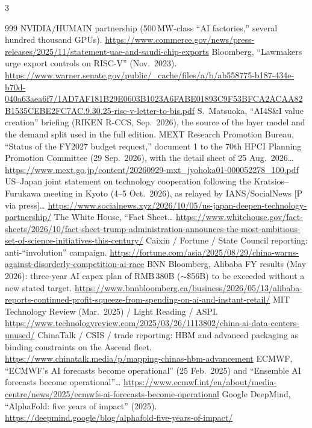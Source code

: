 \begin{multicols}{3}
\begin{thebibliography}{999}
 NVIDIA/HUMAIN partnership (500\,MW-class ``AI factories,'' several hundred thousand GPUs). \url{https://www.commerce.gov/news/press-releases/2025/11/statement-uae-and-saudi-chip-exports}
 Bloomberg, ``Lawmakers urge export controls on RISC-V'' (Nov.\ 2023). \url{https://www.warner.senate.gov/public/_cache/files/a/b/ab558775-b187-434e-b70d-040a63aea6f7/1AD7AF181B29E0603B1023A6FABE01893C9F53BFCA2ACAA82B1535CEBE2FC7AC.9.30.25-risc-v-letter-to-bis.pdf}
 S.~Matsuoka, ``AI4S\&I value creation'' briefing (RIKEN R-CCS, Sep.\ 2026), the source of the layer model and the demand split used in the full edition.
 MEXT Research Promotion Bureau, ``Status of the FY2027 budget request,'' document 1 to the 70th HPCI Planning Promotion Committee (29 Sep.\ 2026), with the detail sheet of 25 Aug.\ 2026… \url{https://www.mext.go.jp/content/20260929-mxt_jyohoka01-000052278_100.pdf}
 US--Japan joint statement on technology cooperation following the Kratsios--Furukawa meeting in Kyoto (4--5 Oct.\ 2026), as relayed by IANS/SocialNews [P via press]… \url{https://www.socialnews.xyz/2026/10/05/us-japan-deepen-technology-partnership/}
 The White House, ``Fact Sheet… \url{https://www.whitehouse.gov/fact-sheets/2026/10/fact-sheet-trump-administration-announces-the-most-ambitious-set-of-science-initiatives-this-century/}
 Caixin / Fortune / State Council reporting: anti-``involution'' campaign. \url{https://fortune.com/asia/2025/08/29/china-warns-against-disorderly-competition-ai-race}
 BNN Bloomberg, Alibaba FY results (May 2026): three-year AI capex plan of RMB\,380B ($\sim$\$56B) to be exceeded without a new stated target. \url{https://www.bnnbloomberg.ca/business/2026/05/13/alibaba-reports-continued-profit-squeeze-from-spending-on-ai-and-instant-retail/}
 MIT Technology Review (Mar.\ 2025) / Light Reading / ASPI. \url{https://www.technologyreview.com/2025/03/26/1113802/china-ai-data-centers-unused/}
 ChinaTalk / CSIS / trade reporting: HBM and advanced packaging as binding constraints on the Ascend fleet. \url{https://www.chinatalk.media/p/mapping-chinas-hbm-advancement}
 ECMWF, ``ECMWF's AI forecasts become operational'' (25 Feb.\ 2025) and ``Ensemble AI forecasts become operational''… \url{https://www.ecmwf.int/en/about/media-centre/news/2025/ecmwfs-ai-forecasts-become-operational}
 Google DeepMind, ``AlphaFold: five years of impact'' (2025). \url{https://deepmind.google/blog/alphafold-five-years-of-impact/}

\end{thebibliography}
\end{multicols}
